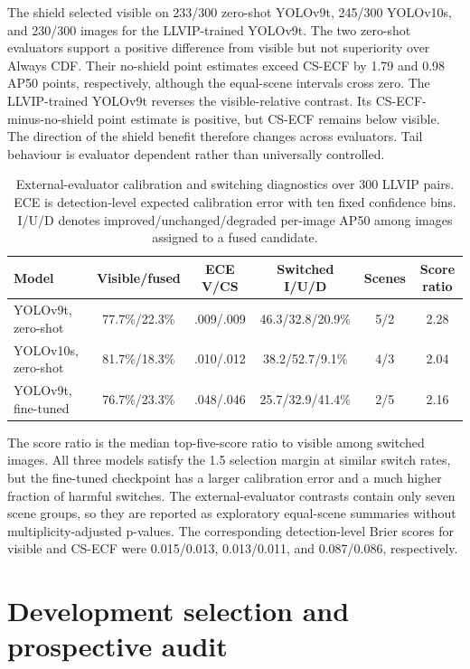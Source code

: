 \documentclass[11pt]{article}
\begin{document}
The shield selected visible on 233/300 zero-shot YOLOv9t, 245/300 YOLOv10s,
and 230/300 images for the LLVIP-trained YOLOv9t. The two zero-shot evaluators
support a positive difference from visible but not superiority over Always
CDF. Their no-shield point estimates exceed CS-ECF by 1.79 and 0.98 AP50
points, respectively, although the equal-scene intervals cross zero.
The LLVIP-trained YOLOv9t reverses the visible-relative contrast. Its
CS-ECF-minus-no-shield point estimate is positive, but CS-ECF remains below
visible. The direction of the shield benefit therefore changes across
evaluators. Tail behaviour is evaluator dependent rather than universally
controlled.

\begin{table}[ht]
\centering
\scriptsize
\setlength{\tabcolsep}{3pt}
\caption{External-evaluator calibration and switching diagnostics over 300
LLVIP pairs. ECE is detection-level expected calibration error with ten fixed
confidence bins. I/U/D denotes improved/unchanged/degraded per-image AP50 among
images assigned to a fused candidate.}
\begin{tabular}{@{}lccccc@{}}
\toprule
Model & Visible/fused & ECE V/CS & Switched I/U/D & Scenes & Score ratio \\
\midrule
YOLOv9t, zero-shot & 77.7\%/22.3\% & .009/.009 &
46.3/32.8/20.9\% & 5/2 & 2.28 \\
YOLOv10s, zero-shot & 81.7\%/18.3\% & .010/.012 &
38.2/52.7/9.1\% & 4/3 & 2.04 \\
YOLOv9t, fine-tuned & 76.7\%/23.3\% & .048/.046 &
25.7/32.9/41.4\% & 2/5 & 2.16 \\
\bottomrule
\end{tabular}
\end{table}

The score ratio is the median top-five-score ratio to visible among switched
images. All three models satisfy the 1.5 selection margin at similar switch
rates, but the fine-tuned checkpoint has a larger calibration error and a much
higher fraction of harmful switches. The external-evaluator contrasts contain
only seven scene groups, so they are reported as exploratory equal-scene
summaries without multiplicity-adjusted p-values.
The corresponding detection-level Brier scores for visible and CS-ECF were
0.015/0.013, 0.013/0.011, and 0.087/0.086, respectively.

\small
\section{Development selection and prospective audit}
\end{document}
